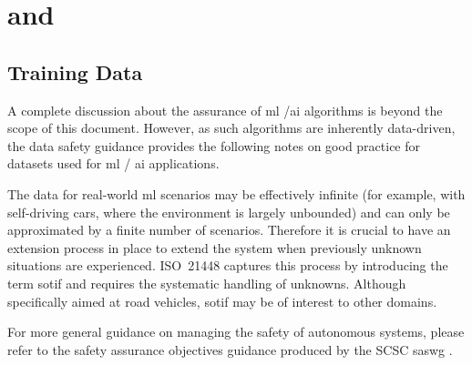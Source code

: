 %
%
\chapter{ and } \label{bkm:MachineLearning}



\section{ Training Data}
A complete discussion about the assurance of \gls{ml} /\gls{ai} algorithms is beyond the scope of this document.
However, as such algorithms are inherently data-driven, the data safety guidance provides the following notes on good practice for \glspl{dataset} used for \gls{ml} / \gls{ai} applications.

The data for real-world \gls{ml} scenarios may be effectively infinite (for example, with self-driving cars, where the environment is largely unbounded) and can only be approximated by a finite number of scenarios.
Therefore it is crucial to have an extension process in place to extend the system when previously unknown situations are experienced. 
ISO~21448 \cite{citation:ISO21448} captures this process by introducing the term \gls{sotif} and requires the systematic handling of unknowns. Although specifically aimed at road vehicles, \gls{sotif} may be of interest to other domains.

For more general guidance on managing the safety of autonomous systems, please refer to the safety assurance objectives guidance produced by the SCSC \gls{saswg} \cite{citation:SASWG:Objectives}.

